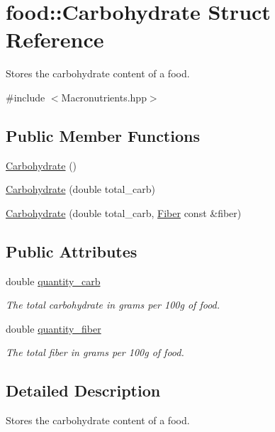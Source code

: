 \hypertarget{structfood_1_1_carbohydrate}{}\section{food\+:\+:Carbohydrate Struct Reference}
\label{structfood_1_1_carbohydrate}


Stores the carbohydrate content of a food.  




{\ttfamily \#include $<$Macronutrients.\+hpp$>$}

\subsection*{Public Member Functions}
\begin{DoxyCompactItemize}
\item 
\hyperlink{structfood_1_1_carbohydrate_a21a8fd981abf8007d2b3f4d3eb516a49}{Carbohydrate} ()
\item 
\hyperlink{structfood_1_1_carbohydrate_a249b85edd7701182b4baac7b5b9d1973}{Carbohydrate} (double total\+\_\+carb)
\item 
\hyperlink{structfood_1_1_carbohydrate_af22de9314711f988826c8e7602472f65}{Carbohydrate} (double total\+\_\+carb, \hyperlink{structfood_1_1_fiber}{Fiber} const \&fiber)
\end{DoxyCompactItemize}
\subsection*{Public Attributes}
\begin{DoxyCompactItemize}
\item 
double \hyperlink{structfood_1_1_carbohydrate_a7f187c69c3f4a4013b2208c207b056dc}{quantity\+\_\+carb}
\begin{DoxyCompactList}\small\item\em The total carbohydrate in grams per 100g of food. \end{DoxyCompactList}\item 
double \hyperlink{structfood_1_1_carbohydrate_a6d66e644feb14e99eeba8e3b3c4b70ac}{quantity\+\_\+fiber}
\begin{DoxyCompactList}\small\item\em The total fiber in grams per 100g of food. \end{DoxyCompactList}\end{DoxyCompactItemize}


\subsection{Detailed Description}
Stores the carbohydrate content of a food. 

